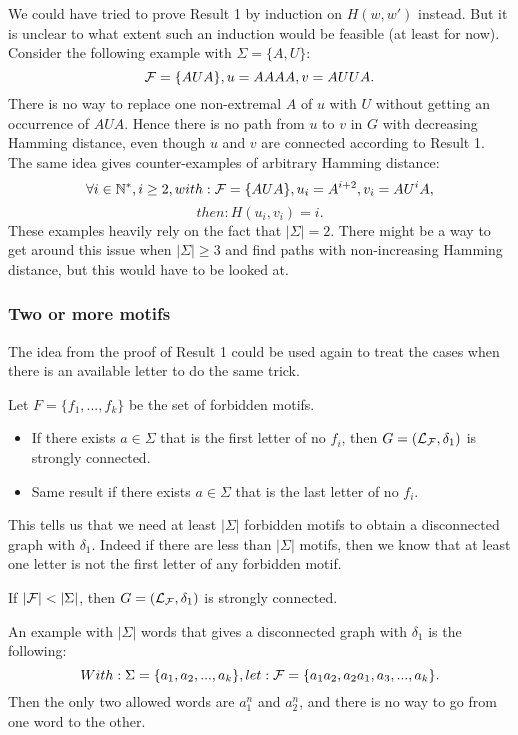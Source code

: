 \documentclass{article}
\begin{document}
We could have tried to prove Result 1 by induction on $H(w,w')$ instead. But it is unclear to what extent such an induction would be feasible (at least for now). Consider the following example with $\Sigma = \{A,U\}:$
$$ \mathcal{F} = \{AUA\}, u=AAAA, v=AUUA.$$
There is no way to replace one non-extremal $A$ of $u$ with $U$ without getting an occurrence of $AUA$. Hence there is no path from $u$ to $v$ in $G$ with decreasing Hamming distance, even though $u$ and $v$ are connected according to Result 1. The same idea gives counter-examples of arbitrary Hamming distance:
$$\forall i \in \mathbb{N}^*, i \geq 2, with: \mathcal{F} = \{AUA\}, u_i=A^{i+2}, v_i=A U^i A,$$
$$then: H(u_i,v_i) = i.$$
These examples heavily rely on the fact that $|\Sigma|=2$. There might be a way to get around this issue when $|\Sigma| \geq 3$ and find paths with non-increasing Hamming distance, but this would have to be looked at.

\subsubsection{Two or more motifs}

The idea from the proof of Result 1 could be used again to treat the cases when there is an available letter to do the same trick.
\begin{result}
	Let $F = \{f_1,...,f_k\}$ be the set of forbidden motifs.
	\begin{itemize}
		\item If there exists $a \in \Sigma$ that is the first letter of no $f_i$, then $G = (\mathcal{L}_{\mathcal{F}}, \delta_1)$ is strongly connected.
		\item Same result if there exists $a \in \Sigma$ that is the last letter of no $f_i$.
	\end{itemize}
\end{result}
\noindent
This tells us that we need at least $|\Sigma|$ forbidden motifs to obtain a disconnected graph with $\delta_1$. Indeed if there are less than $|\Sigma|$ motifs, then we know that at least one letter is not the first letter of any forbidden motif.

\begin{corollary}
	If $|\mathcal{F}| < |\Sigma|$, then $G = (\mathcal{L}_{\mathcal{F}}, \delta_1)$ is strongly connected.
\end{corollary}
\noindent
An example with $|\Sigma|$ words that gives a disconnected graph with $\delta_1$ is the following:
$$With: \Sigma = \{a_1, a_2,...,a_k\}, let: \mathcal{F} = \{a_1 a_2, a_2 a_1, a_3,...,a_k\}.$$
Then the only two allowed words are $a_1^n$ and $a_2^n$, and there is no way to go from one word to the other.
\end{document}
